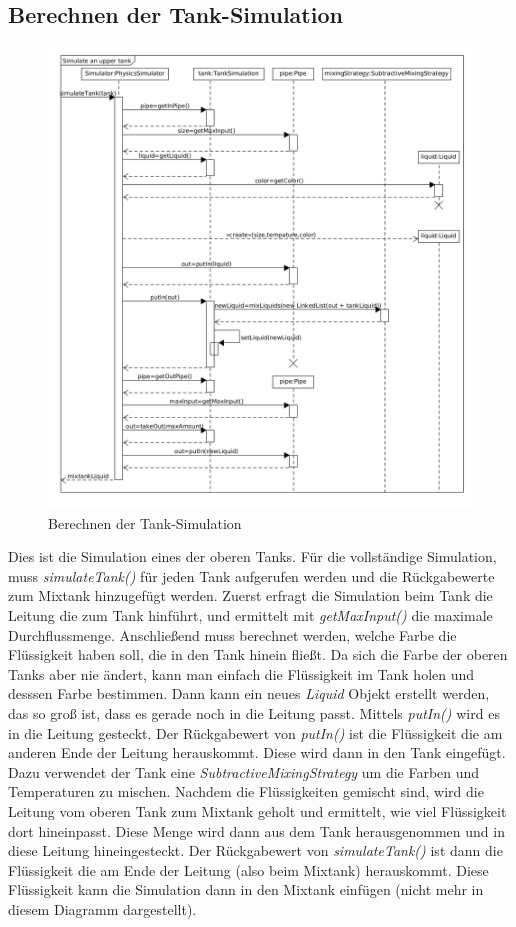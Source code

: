 \documentclass[parskip=full]{scrartcl}
\begin{document}
\subsection{Berechnen der Tank-Simulation}
\begin{figure}[H]
  \centering
  \includegraphics[scale=0.45]{design/sequence-diagrams/tank-simulation.png}
  \caption{Berechnen der Tank-Simulation}
\end{figure}
Dies ist die Simulation eines der oberen Tanks. Für die vollständige Simulation, muss \emph{simulateTank()} für jeden Tank aufgerufen werden
und die Rückgabewerte zum Mixtank hinzugefügt werden. Zuerst erfragt die Simulation beim Tank die Leitung die zum Tank hinführt, und ermittelt
mit \emph{getMaxInput()} die maximale Durchflussmenge. Anschließend muss berechnet werden, welche Farbe die Flüssigkeit haben soll, die in den Tank
hinein fließt. Da sich die Farbe der oberen Tanks aber nie ändert, kann man einfach die Flüssigkeit im Tank holen und desssen Farbe bestimmen.
Dann kann ein neues \emph{Liquid} Objekt erstellt werden, das so groß ist, dass es gerade noch in die Leitung passt. Mittels \emph{putIn()} wird es
in die Leitung gesteckt. Der Rückgabewert von \emph{putIn()} ist die Flüssigkeit die am anderen Ende der Leitung herauskommt. Diese wird dann in den
Tank eingefügt. Dazu verwendet der Tank eine \emph{SubtractiveMixingStrategy} um die Farben und Temperaturen zu mischen. Nachdem die Flüssigkeiten
gemischt sind, wird die Leitung vom oberen Tank zum Mixtank geholt und ermittelt, wie viel Flüssigkeit dort hineinpasst. Diese Menge wird dann aus dem
Tank herausgenommen und in diese Leitung hineingesteckt. Der Rückgabewert von \emph{simulateTank()} ist dann die Flüssigkeit die am Ende der Leitung
(also beim Mixtank) herauskommt. Diese Flüssigkeit kann die Simulation dann in den Mixtank einfügen (nicht mehr in diesem Diagramm dargestellt).
\end{document}
